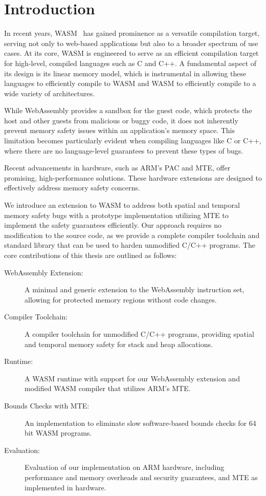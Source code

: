 \chapter{Introduction}
\label{ch:intro}

In recent years, \ac{WASM}~\cite{haas2017bringing} has gained prominence as a versatile compilation target, serving not only to web-based applications but also to a broader spectrum of use cases.
At its core, \ac{WASM} is engineered to serve as an efficient compilation target for high-level, compiled languages such as C and C++.
A fundamental aspect of its design is its linear memory model, which is instrumental in allowing these languages to efficiently compile to \ac{WASM} and \ac{WASM} to efficiently compile to a wide variety of architectures.

While WebAssembly provides a sandbox for the guest code, which protects the host and other guests from malicious or buggy code, it does not inherently prevent memory safety issues within an application's memory space.
This limitation becomes particularly evident when compiling languages like C or C++, where there are no language-level guarantees to prevent these types of bugs.

Recent advancements in hardware, such as ARM's \ac{PAC} and \acf{MTE}, offer promising, high-performance solutions.
These hardware extensions are designed to effectively address memory safety concerns.

We introduce an extension to \ac{WASM} to address both spatial and temporal memory safety bugs with a prototype implementation utilizing \ac{MTE} to implement the safety guarantees efficiently.
Our approach requires no modification to the source code, as we provide a complete compiler toolchain and standard library that can be used to harden unmodified C/C++ programs.
The core contributions of this thesis are outlined as follows:

\begin{description}
    \item[WebAssembly Extension:] A minimal and generic extension to the WebAssembly instruction set, allowing for protected memory regions without code changes.
    \item[Compiler Toolchain:] A compiler toolchain for unmodified C/C++ programs, providing spatial and temporal memory safety for stack and heap allocations.
    \item[Runtime:] A \ac{WASM} runtime with support for our WebAssembly extension and modified \ac{WASM} compiler that utilizes ARM's \ac{MTE}.
    \item[Bounds Checks with \ac{MTE}:] An implementation to eliminate slow software-based bounds checks for 64\,bit \ac{WASM} programs.
    \item[Evaluation:] Evaluation of our implementation on ARM hardware, including performance and memory overheads and security guarantees, and \ac{MTE} as implemented in hardware.
\end{description}
